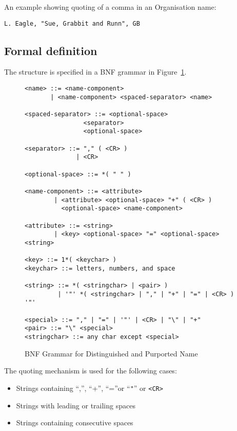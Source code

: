 An example showing quoting of a comma in an Organisation name:

\begin {verbatim}
L. Eagle, "Sue, Grabbit and Runn", GB
\end{verbatim}


\subsection {Formal definition}


The structure is specified in a BNF grammar in Figure~\ref{BNF}.

\begin{figure}
\begin {verbatim}
<name> ::= <name-component>
       | <name-component> <spaced-separator> <name>

<spaced-separator> ::= <optional-space>  
                <separator>
                <optional-space>

<separator> ::= "," ( <CR> )
              | <CR> 

<optional-space> ::= *( " " ) 

<name-component> ::= <attribute> 
        | <attribute> <optional-space> "+" ( <CR> ) 
          <optional-space> <name-component>

<attribute> ::= <string>
        | <key> <optional-space> "=" <optional-space> <string>

<key> ::= 1*( <keychar> )
<keychar> ::= letters, numbers, and space

<string> ::= *( <stringchar> | <pair> )
         | '"' *( <stringchar> | "," | "+" | "=" | <CR> ) '"'
         
<special> ::= "," | "=" | '"' | <CR> | "\" | "+"
<pair> ::= "\" <special> 
<stringchar> ::= any char except <special>

\end{verbatim}
\caption {BNF Grammar for Distinguished and Purported Name}
\label {BNF}
\end{figure}


The quoting mechanism is used for the following cases:

\begin {itemize}
\item Strings containing ``,'', ``+'', ``=''or ``\verb|"|''  or \verb|<CR>|
\item Strings with leading or trailing spaces
\item Strings containing consecutive spaces
\end {itemize}

